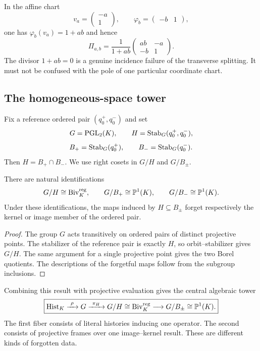 In the affine chart
\[
  v_a=\begin{pmatrix}-a\\1\end{pmatrix},
  \qquad
  \varphi_b=\begin{pmatrix}-b&1\end{pmatrix},
\]
one has $\varphi_b(v_a)=1+ab$ and hence
\begin{equation}
  \Pi_{a,b}
  =\frac{1}{1+ab}
    \begin{pmatrix}ab&-a\\-b&1\end{pmatrix}.
  \label{eq:local-projector}
\end{equation}
The divisor $1+ab=0$ is a genuine incidence failure of the transverse
splitting.  It must not be confused with the pole of one particular coordinate
chart.

\subsection{The homogeneous-space tower}

Fix a reference ordered pair $(q_0^+,q_0^-)$ and set
\[
  G=\operatorname{PGL}_2(K),
  \qquad
  H=\operatorname{Stab}_G(q_0^+,q_0^-),
\]
\[
  B_+=\operatorname{Stab}_G(q_0^+),
  \qquad
  B_-=\operatorname{Stab}_G(q_0^-).
\]
Then $H=B_+\cap B_-$.  We use right cosets in $G/H$ and $G/B_\pm$.

\begin{theorem}
\label{thm:projective-quotient-tower}
There are natural identifications
\[
  G/H\cong\operatorname{Biv}_K^{\mathrm{reg}},
  \qquad
  G/B_+\cong\mathbb{P}^1(K),
  \qquad
  G/B_-\cong\mathbb{P}^1(K).
\]
Under these identifications, the maps induced by
$H\subseteq B_\pm$ forget respectively the kernel or image member of the
ordered pair.
\end{theorem}

\begin{proof}
The group $G$ acts transitively on ordered pairs of distinct projective points.
The stabilizer of the reference pair is exactly $H$, so orbit--stabilizer gives
$G/H$.  The same argument for a single projective point gives the two Borel
quotients.  The descriptions of the forgetful maps follow from the subgroup
inclusions.
\end{proof}

Combining this result with projective evaluation gives the central algebraic
tower
\begin{equation}
\boxed{
  \operatorname{Hist}_K
  \xrightarrow{\ \rho\ }
  G
  \xrightarrow{\ \pi_H\ }
  G/H\cong\operatorname{Biv}_K^{\mathrm{reg}}
  \longrightarrow
  G/B_\pm\cong\mathbb{P}^1(K).
}
\label{eq:paper4-main-tower}
\end{equation}
The first fiber consists of literal histories inducing one operator.  The
second consists of projective frames over one image--kernel result.  These are
different kinds of forgotten data.

